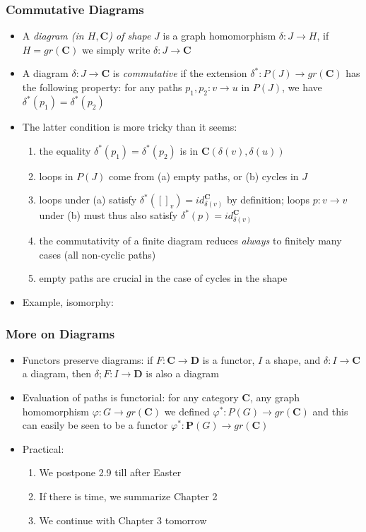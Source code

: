\documentclass[handout]{beamer}
\newcommand{\bfsf}[1]{{\boldsymbol{#1}}}
\newcommand{\CC}{\bfsf{C}}
\newcommand{\DD}{\bfsf{D}}
\newcommand{\PP}{\bfsf{P}}
\begin{document}
\frame
  {   
    \frametitle{Commutative Diagrams}\label{Ch2:CommDiags}

 \begin{itemize}[<+->]
\item A \emph{diagram (in $H,\CC$) of shape} $J$ is a graph homomorphism
$\delta : J\to H$, if $H = gr(\CC)$ we simply write $\delta : J\to \CC$

\item A diagram $\delta : J\to \CC$ is \emph{commutative} if the
extension $\delta^* : P(J) \to gr(\CC)$ has the following property:
for any paths $p_1,p_2 : v\to u$ in $P(J)$, we have $\delta^*(p_1)=\delta^*(p_2)$
\item The latter condition is more tricky than it seems:
   \begin{enumerate}[<+->]
\item the equality $\delta^*(p_1)=\delta^*(p_2)$ is in $\CC(\delta(v),\delta(u))$
\item loops in $P(J)$ come from (a) empty paths, or (b) cycles in $J$
\item loops under (a) satisfy $\delta^*([]_v) = id^\CC_{\delta(v)}$ by definition;
loops $p: v\to v$ under (b) must thus also satisfy $\delta^*(p) = id^\CC_{\delta(v)}$
\item the commutativity of a finite diagram reduces \emph{always}
to finitely many cases (all non-cyclic paths)
\item empty paths are crucial in the case of cycles in the shape
   \end{enumerate}
\item Example, isomorphy:

 \end{itemize}

}

\frame
  {   
    \frametitle{More on Diagrams}\label{Ch2:MoreOnDiags}

 \begin{itemize}[<+->]
\item Functors preserve diagrams: if $F:\CC\to\DD$ is a functor, $I$ a shape,
and $\delta : I\to \CC$ a diagram, then $\delta;F : I\to \DD$ is also a diagram
\item Evaluation of paths is functorial:
for any category $\CC$, any graph homomorphism $\varphi: G\to gr(\CC)$
we defined $\varphi^*: P(G)\to gr(\CC)$ and this can easily be seen
to be a functor $\varphi^*: \PP(G)\to gr(\CC)$
\item Practical:
   \begin{enumerate}[<+->]
\item We postpone 2.9 till after Easter
\item If there is time, we summarize Chapter 2
\item We continue with Chapter 3 tomorrow
   \end{enumerate}
 \end{itemize}

}
\end{document}
